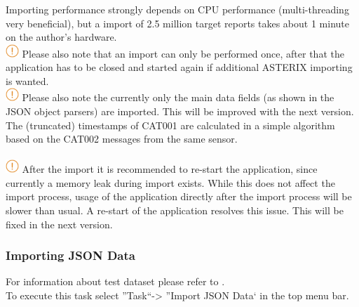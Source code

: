 {Importing performance strongly depends on CPU performance (multi-threading very beneficial), but a import of 2.5 million target reports takes about 1 minute on the author's hardware. \\

\includegraphics[width=0.5cm]{../../data/icons/hint.png} Please also note that an import can only be performed once, after that the application has to be closed and started again if additional ASTERIX importing is wanted. \\

\includegraphics[width=0.5cm]{../../data/icons/hint.png} Please also note the currently only the main data fields (as shown in the JSON object parsers) are imported. This will be improved with the next version. \\

The (truncated) timestamps of CAT001 are calculated in a simple algorithm based on the CAT002 messages from the same sensor. \\\\

\includegraphics[width=0.5cm]{../../data/icons/hint.png} After the import it is recommended to re-start the application, since currently a memory leak during import exists. While this does not affect the import process, usage of the application directly after the import process will be slower than usual. A re-start of the application resolves this issue. This will be fixed in the next version. \\




\subsubsection{Importing JSON Data}
\label{sec:json_import}

For information about test dataset please refer to . \\

To execute this task select ''Task``->  ''Import JSON Data` in the top menu bar.

}
